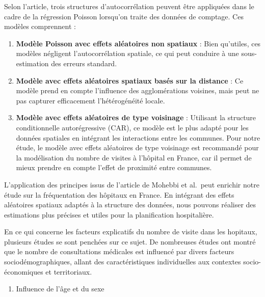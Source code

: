 \documentclass[
]{article}
\providecommand{\tightlist}{%
  \setlength{\itemsep}{0pt}\setlength{\parskip}{0pt}}
\begin{document}
Selon l'article, trois structures d'autocorrélation peuvent être
appliquées dans le cadre de la régression Poisson lorsqu'on traite des
données de comptage. Ces modèles comprennent :

\begin{enumerate}
\def\labelenumi{\arabic{enumi}.}
\item
  \textbf{Modèle Poisson avec effets aléatoires non spatiaux} : Bien
  qu'utiles, ces modèles négligent l'autocorrélation spatiale, ce qui
  peut conduire à une sous-estimation des erreurs standard.
\item
  \textbf{Modèle avec effets aléatoires spatiaux basés sur la distance}
  : Ce modèle prend en compte l'influence des agglomérations voisines,
  mais peut ne pas capturer efficacement l'hétérogénéité locale.
\item
  \textbf{Modèle avec effets aléatoires de type voisinage} : Utilisant
  la structure conditionnelle autorégressive (CAR), ce modèle est le
  plus adapté pour les données spatiales en intégrant les interactions
  entre les communes. Pour notre étude, le modèle avec effets aléatoires
  de type voisinage est recommandé pour la modélisation du nombre de
  visites à l'hôpital en France, car il permet de mieux prendre en
  compte l'effet de proximité entre communes.
\end{enumerate}

L'application des principes issus de l'article de Mohebbi et al.~peut
enrichir notre étude sur la fréquentation des hôpitaux en France. En
intégrant des effets aléatoires spatiaux adaptés à la structure des
données, nous pouvons réaliser des estimations plus précises et utiles
pour la planification hospitalière.

En ce qui concerne les facteurs explicatifs du nombre de visite dans les
hopitaux, plusieurs études se sont penchées sur ce sujet. De nombreuses
études ont montré que le nombre de consultations médicales est influencé
par divers facteurs sociodémographiques, allant des caractéristiques
individuelles aux contextes socio-économiques et territoriaux.

\begin{enumerate}
\def\labelenumi{\arabic{enumi}.}
\tightlist
\item
  Influence de l'âge et du sexe
\end{enumerate}
\end{document}

